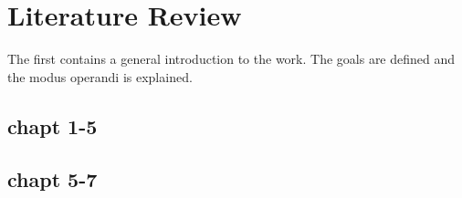 \chapter{Literature Review}
\label{cha:lit_review}
The first contains a general introduction to the work. The goals are
defined and the modus operandi is explained.
\section{chapt 1-5}
\lipsum[1-2]


\section{chapt 5-7}
\lipsum[1-2]
